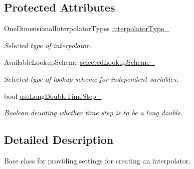 \subsection*{Protected Attributes}
\begin{DoxyCompactItemize}
\item 
One\+Dimensional\+Interpolator\+Types \hyperlink{classtudat_1_1interpolators_1_1InterpolatorSettings_a306a7d727e40447d14d8a83ac44292c6}{interpolator\+Type\+\_\+}\hypertarget{classtudat_1_1interpolators_1_1InterpolatorSettings_a306a7d727e40447d14d8a83ac44292c6}{}\label{classtudat_1_1interpolators_1_1InterpolatorSettings_a306a7d727e40447d14d8a83ac44292c6}

\begin{DoxyCompactList}\small\item\em Selected type of interpolator. \end{DoxyCompactList}\item 
Available\+Lookup\+Scheme \hyperlink{classtudat_1_1interpolators_1_1InterpolatorSettings_a4953b3e5ee75ec9af2fd2bc1544fb976}{selected\+Lookup\+Scheme\+\_\+}\hypertarget{classtudat_1_1interpolators_1_1InterpolatorSettings_a4953b3e5ee75ec9af2fd2bc1544fb976}{}\label{classtudat_1_1interpolators_1_1InterpolatorSettings_a4953b3e5ee75ec9af2fd2bc1544fb976}

\begin{DoxyCompactList}\small\item\em Selected type of lookup scheme for independent variables. \end{DoxyCompactList}\item 
bool \hyperlink{classtudat_1_1interpolators_1_1InterpolatorSettings_a9828fe406d08ef1c0435f4b2dca5a047}{use\+Long\+Double\+Time\+Step\+\_\+}\hypertarget{classtudat_1_1interpolators_1_1InterpolatorSettings_a9828fe406d08ef1c0435f4b2dca5a047}{}\label{classtudat_1_1interpolators_1_1InterpolatorSettings_a9828fe406d08ef1c0435f4b2dca5a047}

\begin{DoxyCompactList}\small\item\em Boolean denoting whether time step is to be a long double. \end{DoxyCompactList}\end{DoxyCompactItemize}


\subsection{Detailed Description}
Base class for providing settings for creating an interpolator. 

